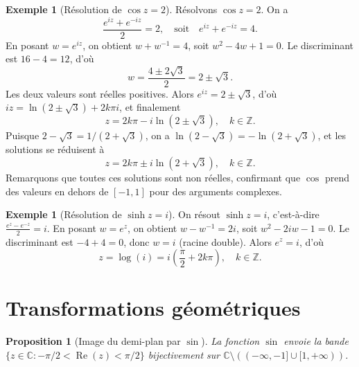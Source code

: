 \documentclass[12pt,a4paper,openany]{book}
\theoremstyle{definition}
\newtheorem{exemple}[definition]{Exemple}
\theoremstyle{plain}
\newtheorem{proposition}[definition]{Proposition}
\theoremstyle{remark}
\newcommand{\C}{\mathbb{C}}
\newcommand{\Z}{\mathbb{Z}}
\DeclareMathOperator{\re}{Re}
\begin{document}
\begin{exemple}[Résolution de $\cos z = 2$]\label{ex:cos-egal-2}
Résolvons $\cos z = 2$. On a
\[
  \frac{e^{iz}+e^{-iz}}{2} = 2, \quad\text{soit}\quad e^{iz} + e^{-iz} = 4.
\]
En posant $w = e^{iz}$, on obtient $w + w^{-1} = 4$, soit $w^2 - 4w + 1 = 0$.
Le discriminant est $16 - 4 = 12$, d'où
\[
  w = \frac{4 \pm 2\sqrt{3}}{2} = 2 \pm \sqrt{3}.
\]
Les deux valeurs sont réelles positives. Alors $e^{iz} = 2 \pm \sqrt{3}$, d'où
$iz = \ln(2 \pm \sqrt{3}) + 2k\pi i$, et finalement
\[
  z = 2k\pi - i\ln(2 \pm \sqrt{3}), \quad k \in \Z.
\]
Puisque $2 - \sqrt{3} = 1/(2+\sqrt{3})$, on a $\ln(2-\sqrt{3}) = -\ln(2+\sqrt{3})$,
et les solutions se réduisent à
\[
  z = 2k\pi \pm i\ln(2+\sqrt{3}), \quad k \in \Z.
\]
Remarquons que toutes ces solutions sont non réelles, confirmant que $\cos$ prend
des valeurs en dehors de $[-1,1]$ pour des arguments complexes.
\end{exemple}

\begin{exemple}[Résolution de $\sinh z = i$]\label{ex:sinh-egal-i}
On résout $\sinh z = i$, c'est-à-dire $\frac{e^z - e^{-z}}{2} = i$. En posant $w = e^z$, on obtient $w - w^{-1} = 2i$, soit $w^2 - 2iw - 1 = 0$. Le discriminant est $-4 + 4 = 0$, donc $w = i$ (racine double). Alors $e^z = i$, d'où
\[
  z = \log(i) = i\left(\frac{\pi}{2} + 2k\pi\right), \quad k \in \Z.
\]
\end{exemple}

\section{Transformations géométriques}\label{sec:transformations-geometriques}

\begin{proposition}[Image du demi-plan par $\sin$]\label{prop:sin-demi-plan}
La fonction $\sin$ envoie la bande $\{z \in \C : -\pi/2 < \re(z) < \pi/2\}$
bijectivement sur $\C \setminus ((-\infty,-1] \cup [1,+\infty))$.
\end{proposition}
\end{document}
